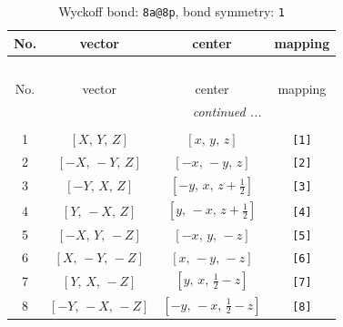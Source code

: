 \documentclass[fleqn,8pt]{jsarticle}
\begin{document}
\begin{longtable}{cccc}
\caption{Wyckoff bond: {\tt 8a@8p}, bond symmetry: {\tt 1}}
 \\
 \hline \hline
No. & vector & center & mapping \\ \hline \endfirsthead

\multicolumn{3}{l}{\tablename\ \thetable{}} \\
 \hline \hline
No. & vector & center & mapping \\ \hline \endhead

 \hline \hline
\multicolumn{3}{r}{\footnotesize\it continued ...} \\ \endfoot

 \hline \hline
\multicolumn{3}{r}{} \\ \endlastfoot

1 & $\left[ X,\, Y,\, Z \right]$ & $\left[ x,\, y,\, z \right]$ & {\tt [1]} \\ \hline
2 & $\left[ - X,\, - Y,\, Z \right]$ & $\left[ - x,\, - y,\, z \right]$ & {\tt [2]} \\ \hline
3 & $\left[ - Y,\, X,\, Z \right]$ & $\left[ - y,\, x,\, z + \frac{1}{2} \right]$ & {\tt [3]} \\ \hline
4 & $\left[ Y,\, - X,\, Z \right]$ & $\left[ y,\, - x,\, z + \frac{1}{2} \right]$ & {\tt [4]} \\ \hline
5 & $\left[ - X,\, Y,\, - Z \right]$ & $\left[ - x,\, y,\, - z \right]$ & {\tt [5]} \\ \hline
6 & $\left[ X,\, - Y,\, - Z \right]$ & $\left[ x,\, - y,\, - z \right]$ & {\tt [6]} \\ \hline
7 & $\left[ Y,\, X,\, - Z \right]$ & $\left[ y,\, x,\, \frac{1}{2} - z \right]$ & {\tt [7]} \\ \hline
8 & $\left[ - Y,\, - X,\, - Z \right]$ & $\left[ - y,\, - x,\, \frac{1}{2} - z \right]$ & {\tt [8]} \\
\end{longtable}
\end{document}
